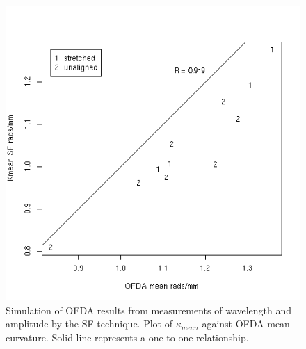 %

\begin{figure}[!h]
  \centering
  \includegraphics[width=1.0\textwidth]{figofdasimsfmean.png}
  \caption{Simulation of OFDA results from measurements of wavelength and amplitude by the SF technique. Plot of $\kappa_{mean}$ against OFDA mean curvature. Solid line represents a one-to-one relationship.}
\label{fig:ofdasimsfmean}
\end{figure}

%

